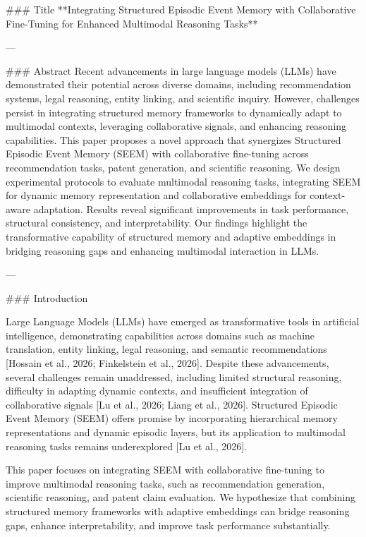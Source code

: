 ### Title  
**Integrating Structured Episodic Event Memory with Collaborative Fine-Tuning for Enhanced Multimodal Reasoning Tasks**

---

### Abstract  
Recent advancements in large language models (LLMs) have demonstrated their potential across diverse domains, including recommendation systems, legal reasoning, entity linking, and scientific inquiry. However, challenges persist in integrating structured memory frameworks to dynamically adapt to multimodal contexts, leveraging collaborative signals, and enhancing reasoning capabilities. This paper proposes a novel approach that synergizes Structured Episodic Event Memory (SEEM) with collaborative fine-tuning across recommendation tasks, patent generation, and scientific reasoning. We design experimental protocols to evaluate multimodal reasoning tasks, integrating SEEM for dynamic memory representation and collaborative embeddings for context-aware adaptation. Results reveal significant improvements in task performance, structural consistency, and interpretability. Our findings highlight the transformative capability of structured memory and adaptive embeddings in bridging reasoning gaps and enhancing multimodal interaction in LLMs.

---

### Introduction  

Large Language Models (LLMs) have emerged as transformative tools in artificial intelligence, demonstrating capabilities across domains such as machine translation, entity linking, legal reasoning, and semantic recommendations [Hossain et al., 2026; Finkelstein et al., 2026]. Despite these advancements, several challenges remain unaddressed, including limited structural reasoning, difficulty in adapting dynamic contexts, and insufficient integration of collaborative signals [Lu et al., 2026; Liang et al., 2026]. Structured Episodic Event Memory (SEEM) offers promise by incorporating hierarchical memory representations and dynamic episodic layers, but its application to multimodal reasoning tasks remains underexplored [Lu et al., 2026].

This paper focuses on integrating SEEM with collaborative fine-tuning to improve multimodal reasoning tasks, such as recommendation generation, scientific reasoning, and patent claim evaluation. We hypothesize that combining structured memory frameworks with adaptive embeddings can bridge reasoning gaps, enhance interpretability, and improve task performance substantially.  

